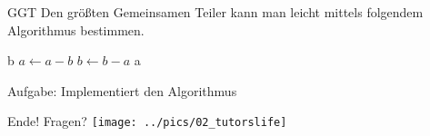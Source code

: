 \documentclass{beamer}
\begin{document}
\begin{frame}[fragile]{GGT}
Den größten Gemeinsamen Teiler kann man leicht mittels folgendem Algorithmus bestimmen.

\begin{algorithmic}
   \State \Return b
 \EndIf
     \State $a \gets a - b$
   \Else
     \State $b \gets b - a$
   \EndIf
 \EndWhile
 \State \Return a
\end{algorithmic}
Aufgabe: Implementiert den Algorithmus
\end{frame}
 
 
\begin{frame}{Ende! Fragen?}
 \texttt{[image: ../pics/02\_tutorslife]} 
\end{frame}
\end{document}
